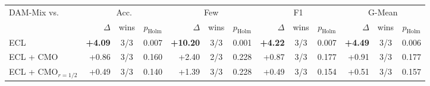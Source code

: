 \begin{tabular}{lrccrccrccrcc}
\toprule
DAM-Mix vs. & \multicolumn{3}{c}{Acc.} & \multicolumn{3}{c}{Few} & \multicolumn{3}{c}{F1} & \multicolumn{3}{c}{G-Mean} \\
 & $\Delta$ & wins & $p_{\mathrm{Holm}}$ & $\Delta$ & wins & $p_{\mathrm{Holm}}$ & $\Delta$ & wins & $p_{\mathrm{Holm}}$ & $\Delta$ & wins & $p_{\mathrm{Holm}}$ \\
\midrule
ECL & \textbf{+4.09} & 3/3 & 0.007 & \textbf{+10.20} & 3/3 & 0.001 & \textbf{+4.22} & 3/3 & 0.007 & \textbf{+4.49} & 3/3 & 0.006 \\
ECL + CMO & +0.86 & 3/3 & 0.160 & +2.40 & 2/3 & 0.228 & +0.87 & 3/3 & 0.177 & +0.91 & 3/3 & 0.177 \\
ECL + CMO$_{r=1/2}$ & +0.49 & 3/3 & 0.140 & +1.39 & 3/3 & 0.228 & +0.49 & 3/3 & 0.154 & +0.51 & 3/3 & 0.157 \\
\bottomrule
\end{tabular}
